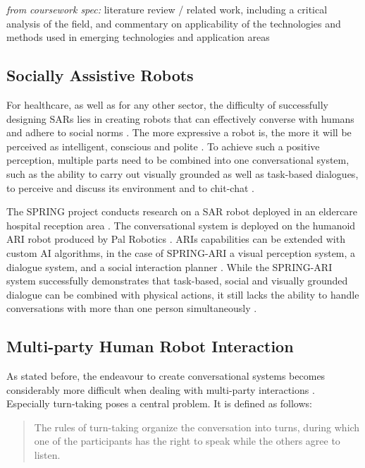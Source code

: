 \documentclass[hidelinks, 11pt]{article}
\begin{document}
\textit{from coursework spec:} literature review / related work, including a critical analysis of the field, and commentary on applicability of the technologies and methods used in emerging technologies and application areas

\subsection{Socially Assistive Robots}
\label{subsec:socially_assistive_robots}
For healthcare, as well as for any other sector, the difficulty of successfully designing SARs lies in creating robots that can effectively converse with humans and adhere to social norms \cite{moujahid_multi_party_2022}. The more expressive a robot is, the more it will be perceived as intelligent, conscious and polite \cite{moujahid_multi_party_2022}. To achieve such a positive perception, multiple parts need to be combined into one conversational system, such as the ability to carry out visually grounded as well as task-based dialogues, to perceive and discuss its environment and to chit-chat \cite{gunson_visually_aware_2022}.

The SPRING project conducts research on a SAR robot deployed in an eldercare hospital reception area \cite{addlesee_comprehensive_2020}. The conversational system is deployed on the humanoid ARI robot produced by Pal Robotics \cite{palrobot}. ARIs capabilities can be extended with custom AI algorithms, in the case of SPRING-ARI a visual perception system, a dialogue system, and a social interaction planner \cite{addlesee_comprehensive_2020}. While the SPRING-ARI system successfully demonstrates that task-based, social and visually grounded dialogue can be combined with physical actions, it still lacks the ability to handle conversations with more than one person simultaneously \cite{addlesee_comprehensive_2020}.

\subsection{Multi-party Human Robot Interaction}
\label{subsec:multi_party}
As stated before, the endeavour to create conversational systems becomes considerably more difficult when dealing with multi-party interactions \cite{Group_1_unpublished_paper}. Especially turn-taking poses a central problem. It is defined as follows:

\begin{quote}
  The rules of turn-taking organize the conversation into turns, during which one of the participants has the right to speak while the others agree to listen. \cite{Żarkowski_2019}
\end{quote}
\end{document}
